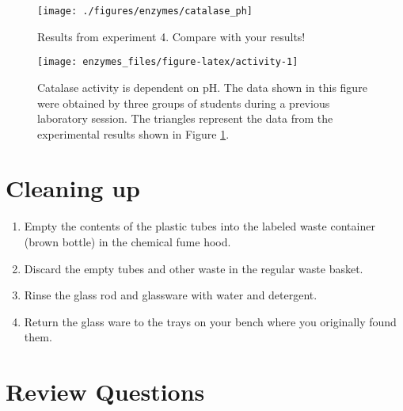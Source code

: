 \begin{figure}

{\centering \texttt{[image: ./figures/enzymes/catalase\_ph]} 

}

\caption{Results from experiment 4. Compare with your results!}\label{fig:pH}
\end{figure}






\begin{figure}

{\centering \texttt{[image: enzymes\_files/figure-latex/activity-1]} 

}

\caption{Catalase activity is dependent on pH. The data shown in this
figure were obtained by three groups of students during a previous
laboratory session. The triangles represent the data from the
experimental results shown in Figure \ref{fig:pH}.}\label{fig:activity}
\end{figure}

\section{Cleaning up}\label{cleaning-up-5}

\begin{enumerate}
\def\labelenumi{\arabic{enumi}.}
\tightlist
\item
  Empty the contents of the plastic tubes into the labeled waste
  container (brown bottle) in the chemical fume hood.
\item
  Discard the empty tubes and other waste in the regular waste basket.
\item
  Rinse the glass rod and glassware with water and detergent.
\item
  Return the glass ware to the trays on your bench where you originally
  found them.
\end{enumerate}

\section{Review Questions}\label{review-questions-4}


